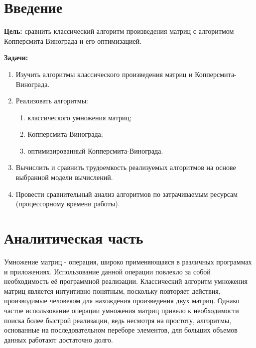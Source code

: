 \documentclass[a4paper,oneside,14pt]{extreport}
\begin{document}

\newpage
\tableofcontents
{}

\newpage

\chapter*{Введение}

\textbf{Цель:} сравнить классический алгоритм произведения матриц с алгоритмом Копперсмита-Винограда и его оптимизацией.

\textbf{Задачи:}
\begin{enumerate}
	\item Изучить алгоритмы классического произведения матриц и Копперсмита-Винограда.
	\item Реализовать алгоритмы:
	\begin{enumerate}
		\item классического умножения матриц;
		\item Копперсмита-Винограда;
		\item оптимизированный Копперсмита-Винограда.
	\end{enumerate}
	\item Вычислить и сравнить трудоемкость реализуемых алгоритмов на основе выбранной модели вычислений.
	\item Провести сравнительный анализ алгоритмов по затрачиваемым ресурсам (процессорному времени работы).
\end{enumerate}
\newpage

\chapter{ Аналитическая часть}
Умножение матриц - операция, широко применяющаяся в различных программах и приложениях. Использование данной операции повлекло за собой необходимость её программной реализации. Классический алгоритм умножения матриц является интуитивно понятным, поскольку повторяет действия, производимые человеком для нахождения произведения двух матриц. Однако частое использование операции умножения матриц привело к необходимости поиска более быстрой реализации, ведь несмотря на простоту, алгоритмы, основанные на последовательном переборе элементов, для больших объемов данных работают достаточно долго.
\end{document}
